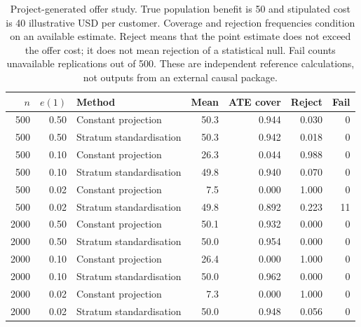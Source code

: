 \begin{table}[htbp]
\centering\small
\begin{tabular}{rrlrrrr}
\toprule
$n$ & $e(1)$ & Method & Mean & ATE cover & Reject & Fail \\
\midrule
500 & 0.50 & Constant projection & 50.3 & 0.944 & 0.030 & 0 \\
500 & 0.50 & Stratum standardisation & 50.3 & 0.942 & 0.018 & 0 \\
500 & 0.10 & Constant projection & 26.3 & 0.044 & 0.988 & 0 \\
500 & 0.10 & Stratum standardisation & 49.8 & 0.940 & 0.070 & 0 \\
500 & 0.02 & Constant projection & 7.5 & 0.000 & 1.000 & 0 \\
500 & 0.02 & Stratum standardisation & 49.8 & 0.892 & 0.223 & 11 \\
2000 & 0.50 & Constant projection & 50.1 & 0.932 & 0.000 & 0 \\
2000 & 0.50 & Stratum standardisation & 50.0 & 0.954 & 0.000 & 0 \\
2000 & 0.10 & Constant projection & 26.4 & 0.000 & 1.000 & 0 \\
2000 & 0.10 & Stratum standardisation & 50.0 & 0.962 & 0.000 & 0 \\
2000 & 0.02 & Constant projection & 7.3 & 0.000 & 1.000 & 0 \\
2000 & 0.02 & Stratum standardisation & 50.0 & 0.948 & 0.056 & 0 \\
\bottomrule
\end{tabular}
\caption{Project-generated offer study. True population benefit is 50 and
stipulated cost is 40 illustrative USD per customer. Coverage and rejection
frequencies condition on an available estimate. Reject means that the point
estimate does not exceed the offer cost; it does not mean rejection of a
statistical null. Fail counts unavailable replications out of 500. These are independent reference calculations,
not outputs from an external causal package.}
\label{scisyn:offer-results}
\end{table}
